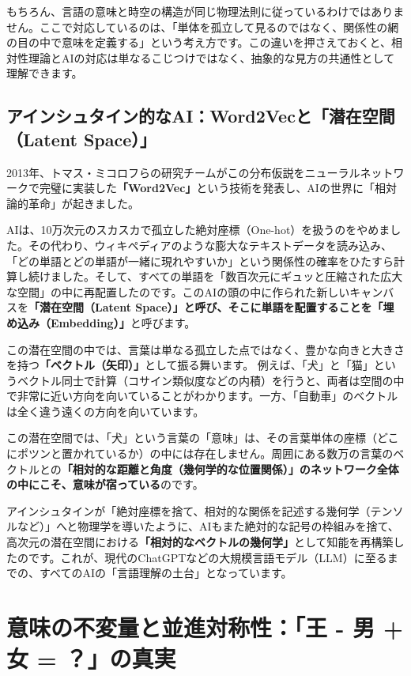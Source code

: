 もちろん、言語の意味と時空の構造が同じ物理法則に従っているわけではありません。ここで対応しているのは、「単体を孤立して見るのではなく、関係性の網の目の中で意味を定義する」という考え方です。この違いを押さえておくと、相対性理論とAIの対応は単なるこじつけではなく、抽象的な見方の共通性として理解できます。

\subsection{アインシュタイン的なAI：Word2Vecと「潜在空間（Latent Space）」}

2013年、トマス・ミコロフらの研究チームがこの分布仮説をニューラルネットワークで完璧に実装した\textbf{「Word2Vec」}という技術を発表し、AIの世界に「相対論的革命」が起きました。

AIは、10万次元のスカスカで孤立した絶対座標（One-hot）を扱うのをやめました。その代わり、ウィキペディアのような膨大なテキストデータを読み込み、「どの単語とどの単語が一緒に現れやすいか」という関係性の確率をひたすら計算し続けました。そして、すべての単語を「数百次元にギュッと圧縮された広大な空間」の中に再配置したのです。このAIの頭の中に作られた新しいキャンバスを\textbf{「潜在空間（Latent Space）」と呼び、そこに単語を配置することを「埋め込み（Embedding）」}と呼びます。

この潜在空間の中では、言葉は単なる孤立した点ではなく、豊かな向きと大きさを持つ\textbf{「ベクトル（矢印）」}として振る舞います。 例えば、「犬」と「猫」というベクトル同士で計算（コサイン類似度などの内積）を行うと、両者は空間の中で非常に近い方向を向いていることがわかります。一方、「自動車」のベクトルは全く違う遠くの方向を向いています。

この潜在空間では、「犬」という言葉の「意味」は、その言葉単体の座標（どこにポツンと置かれているか）の中には存在しません。周囲にある数万の言葉のベクトルとの\textbf{「相対的な距離と角度（幾何学的な位置関係）」のネットワーク全体の中にこそ、意味が宿っている}のです。

アインシュタインが「絶対座標を捨て、相対的な関係を記述する幾何学（テンソルなど）」へと物理学を導いたように、AIもまた絶対的な記号の枠組みを捨て、高次元の潜在空間における\textbf{「相対的なベクトルの幾何学」}として知能を再構築したのです。これが、現代のChatGPTなどの大規模言語モデル（LLM）に至るまでの、すべてのAIの「言語理解の土台」となっています。

\section{意味の不変量と並進対称性：「王 - 男 + 女 = ？」の真実}


